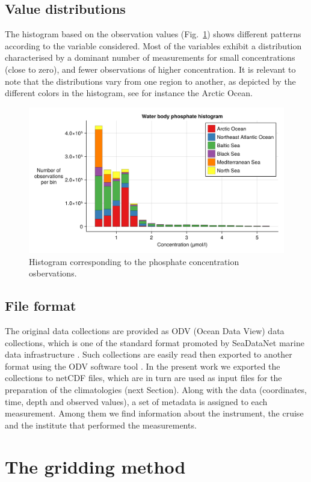 \documentclass[essd, manuscript]{copernicus}
\begin{document}
\subsection{Value distributions}

The histogram based on the observation values (Fig.~\ref{fig:histogram_value_Water_body_phosphate}) shows different patterns according to the variable considered. Most of the variables exhibit a distribution characterised by a dominant number of measurements for small concentrations (close to zero), and fewer observations of higher concentration. It is relevant to note that the distributions vary from one region to another, as depicted by the different colors in the histogram, see for instance the Arctic Ocean.

\begin{figure}[t]
\centering
\includegraphics[width=.5\textwidth]{histogram_value_Water_body_phosphate.png}
\caption{Histogram corresponding to the phosphate concentration osbervations.\label{fig:histogram_value_Water_body_phosphate}}
\end{figure}


\subsection{File format}

The original data collections are provided as ODV (Ocean Data View) data collections, which is one of the standard format promoted by SeaDataNet marine data infrastructure \citep{Lowry2023}. Such collections are easily read then exported to another format using the ODV software tool \citep{SCHLITZER2002}. In the present work we exported the collections to netCDF files, which are in turn are used as input files for the preparation of the climatologies (next Section). Along with the data (coordinates, time, depth and observed values), a set of metadata is assigned to each measurement. Among them we find information about the instrument, the cruise and the institute that performed the measurements. 

\section{The gridding method\label{sec:method}}
\end{document}
